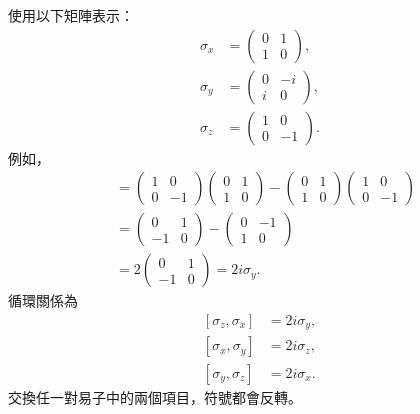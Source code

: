 使用以下矩陣表示：
\begin{equation}
\begin{aligned}
\sigma_x&=
\begin{pmatrix}0&1\\1&0\end{pmatrix},\\[0.4em]
\sigma_y&=
\begin{pmatrix}0&-i\\i&0\end{pmatrix},\\[0.4em]
\sigma_z&=
\begin{pmatrix}1&0\\0&-1\end{pmatrix}.
\end{aligned}
\end{equation}
例如，
\begin{align}
[\sigma_z,\sigma_x]
&=
\begin{pmatrix}1&0\\0&-1\end{pmatrix}
\begin{pmatrix}0&1\\1&0\end{pmatrix}
-
\begin{pmatrix}0&1\\1&0\end{pmatrix}
\begin{pmatrix}1&0\\0&-1\end{pmatrix}\\
&=
\begin{pmatrix}0&1\\-1&0\end{pmatrix}
-
\begin{pmatrix}0&-1\\1&0\end{pmatrix}\\
&=2
\begin{pmatrix}0&1\\-1&0\end{pmatrix}
=2i\sigma_y.
\end{align}
循環關係為
\begin{equation}
\begin{aligned}
[\sigma_z,\sigma_x]&=2i\sigma_y,\\
[\sigma_x,\sigma_y]&=2i\sigma_z,\\
[\sigma_y,\sigma_z]&=2i\sigma_x.
\end{aligned}
\label{eq:l5-pauli-commutators}
\end{equation}
交換任一對易子中的兩個項目，符號都會反轉。

